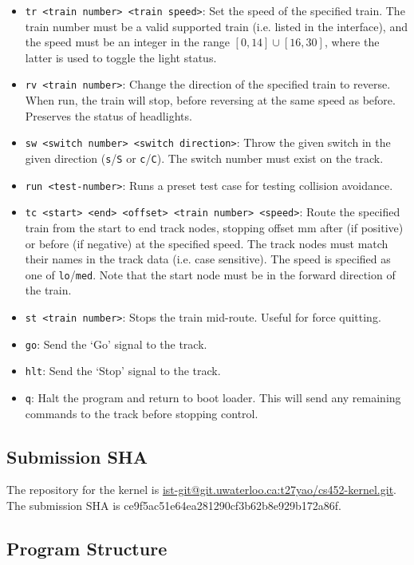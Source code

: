\documentclass[12pt, titlepage]{article}
\begin{document}
    \begin{itemize}
        \item \verb`tr <train number> <train speed>`: Set the speed of the specified train. The train number must be a valid supported train (i.e. listed in the interface), and the speed must be an integer in the range $[0,14] \cup [16,30]$, where the latter is used to toggle the light status.
        \item \verb`rv <train number>`: Change the direction of the specified train to reverse. When run, the train will stop, before reversing at the same speed as before. Preserves the status of headlights.
        \item \verb`sw <switch number> <switch direction>`: Throw the given switch in the given direction (\verb`s`/\verb`S` or \verb`c`/\verb`C`). The switch number must exist on the track.
        \item \verb`run <test-number>`: Runs a preset test case for testing collision avoidance.
        \item \verb`tc <start> <end> <offset> <train number> <speed>`: Route the specified train from the start to end track nodes, stopping offset mm after (if positive) or before (if negative) at the specified speed. The track nodes must match their names in the track data (i.e. case sensitive). The speed is specified as one of \verb`lo`/\verb`med`. Note that the start node must be in the forward direction of the train.
        \item \verb`st <train number>`: Stops the train mid-route. Useful for force quitting.
        \item \verb`go`: Send the `Go' signal to the track.
        \item \verb`hlt`: Send the `Stop' signal to the track.
        \item \verb`q`: Halt the program and return to boot loader. This will send any remaining commands to the track before stopping control.
    \end{itemize}

    \subsection{Submission SHA}

    The repository for the kernel is \href{https://git.uwaterloo.ca/t27yao/cs452-kernel}{ist-git@git.uwaterloo.ca:t27yao/cs452-kernel.git}. The submission SHA is ce9f5ac51e64ea281290cf3b62b8e929b172a86f.

    \subsection{Program Structure}
\end{document}
